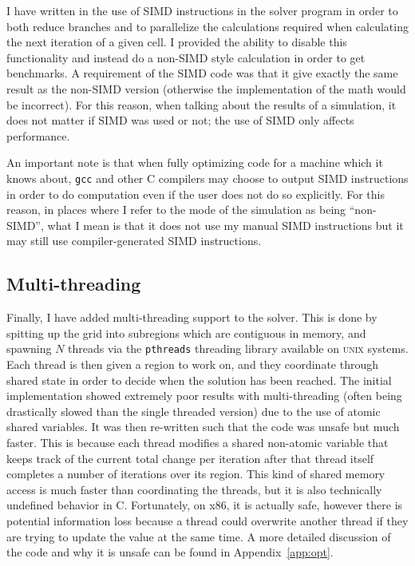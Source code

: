 I have written in the use of SIMD instructions in the solver program in order to both reduce branches and to parallelize
the calculations required when calculating the next iteration of a given cell. I provided the ability to disable this
functionality and instead do a non-SIMD style calculation in order to get benchmarks. A requirement of the SIMD code was
that it give exactly the same result as the non-SIMD version (otherwise the implementation of the math would be incorrect).
For this reason, when talking about the results of a simulation, it does not matter if SIMD was used or not; the use
of SIMD only affects performance.

An important note is that when fully optimizing code for a machine which it knows about, \texttt{gcc} and other C compilers may choose to output
SIMD instructions in order to do computation even if the user does not do so explicitly. For this reason, in places where
I refer to the mode of the simulation as being ``non-SIMD'', what I mean is that it does not use my manual SIMD instructions
but it may still use compiler-generated SIMD instructions.

















\subsection{Multi-threading}
Finally, I have added multi-threading support to the solver. This is done by spitting up the grid into subregions which
are contiguous in memory, and spawning $N$ threads via the \texttt{pthreads} threading library available on \textsc{unix} systems. Each thread is then given a region to work on,
and they coordinate through shared state in order to decide when the solution has been reached. The initial implementation
showed extremely poor results with multi-threading (often being drastically slowed than the single threaded version)
due to the use of atomic shared variables. It was then re-written such that the code was unsafe but much faster. This
is because each thread modifies a shared non-atomic variable that keeps track of the current total change per iteration
after that thread itself completes a number of iterations over its region. This kind of shared memory access is much faster
than coordinating the threads, but it is also technically undefined behavior in C. Fortunately, on x86, it is actually
safe, however there is potential information loss because a thread could overwrite another thread if they are trying to
update the value at the same time. A more detailed discussion of the code and why it is unsafe can be found in Appendix~\ref{app:opt}.


















